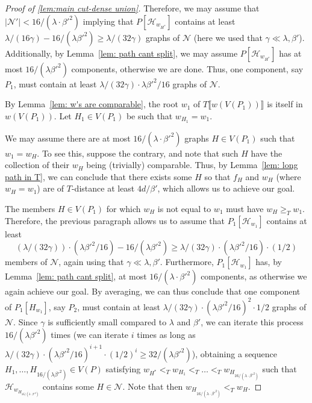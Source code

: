\documentclass[10pt]{article}
\theoremstyle{definition}
\let\geq\geqslant
\begin{document}
\begin{proof}[Proof of \cref{lem:main cut-dense union}]
    Therefore, we may assume that $|\mathcal N'|< 16/(\lambda \cdot \beta'^2 )$ implying that $P[\mathcal H_{w_{H^*}}]$ contains at least $\lambda/(16\gamma)-16/(\lambda \beta'^2) \geq\lambda /(32\gamma)$ graphs of $\mathcal N$ (here we used that $\gamma\ll \lambda,\beta'$). Additionally, by Lemma~\ref{lem: path cant split}, we may assume $P[\mathcal H_{w_{H^*}}]$ has at most $16/(\lambda \beta'^2 )$ components, otherwise we are done. Thus, one component, say $P_1$, must contain at least $\lambda /(32\gamma)\cdot \lambda  \beta'^2 /16$ graphs of $\mathcal N$. 
    \par By Lemma~\ref{lem: w's are comparable}, the root $w_1$ of $T\llbracket w(V(P_1))\rrbracket$ is itself in $w(V(P_1))$. Let $H_1\in V(P_1)$ be such that $w_{H_1}=w_1$. 
        \par We may assume there are at most $16/(\lambda  \cdot \beta'^2 )$ graphs $H\in V(P_1)$ such that $w_1=w_H$. To see this, suppose the contrary, and note that such $H$ have the collection of their $w_H$ being (trivially) comparable. Thus, by Lemma~\ref{lem: long path in T}, we can conclude that there exists some $H$ so that $f_H$ and $w_H$ (where $w_H=w_1$) are of $T$-distance at least $4d/\beta'$, which allows us to achieve our goal.
    \par The members $H\in V(P_1)$ for which $w_H$ is not equal to $w_1$ must have $w_H\geq_T w_1$. Therefore, the previous paragraph allows us to assume that $P_1[\mathcal H_{w_1}]$ contains at least $$(\lambda/(32\gamma))\cdot (\lambda \beta'^2/16) - 16/(\lambda\beta'^2) \geq \lambda /(32\gamma)\cdot (\lambda  \beta'^2 /16)\cdot (1/2)$$ members of $\mathcal N$, again using that $\gamma \ll \lambda,\beta'$. Furthermore, $P_1[\mathcal H_{w_1}]$ has, by Lemma~\ref{lem: path cant split}, at most $16/(\lambda \cdot \beta'^2 )$ components, as otherwise we again achieve our goal. By averaging, we can thus conclude that one component of $P_1[H_{w_1}]$, say $P_2$, must contain at least $\lambda /(32\gamma)\cdot (\lambda \beta'^2 /16)^2\cdot 1/2$ graphs of $\mathcal N$. Since $\gamma$ is sufficiently small compared to $\lambda $ and $\beta' $, we can iterate this process $16/(\lambda  \beta'^2 )$ times (we can iterate $i$ times as long as $\lambda /(32\gamma)\cdot (\lambda  \beta'^2 /16)^{i+1}\cdot (1/2)^i\geq 32/(\lambda\beta'^2)$), obtaining a sequence $H_1,\ldots,H_{16/(\lambda\beta'^2)}\in V(P)$ satisfying $w_{H^*}<_T w_{H_1}<_T \dots<_T w_{H_{16/(\lambda \cdot \beta'^2 )}}$ such that $\mathcal H_{w_{H_{16/(\lambda \cdot \beta'^2 )}}}$ contains some $H\in\mathcal N$. Note that then $w_{H_{16/(\lambda \cdot \beta'^2 )}}<_T w_H$.
    

\end{proof}
\end{document}
